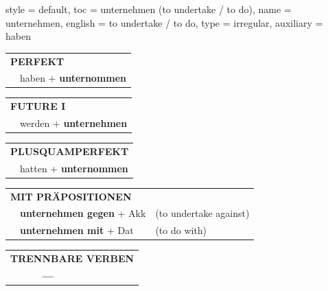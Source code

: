 \begin{verbentry}{
  style = {default},
  toc = {unternehmen (to undertake / to do)},
  name = {unternehmen},
  english = {to undertake / to do},
  type = {irregular},
  auxiliary = {haben}
}
 \begin{tabular}{rl}
     \multicolumn{2}{l}{\textbf{PERFEKT}}\\
   & haben + \textbf{unternommen}\\
  \end{tabular}
\hfill
   \begin{tabular}{rl}
    \multicolumn{2}{l}{\textbf{FUTURE I} }\\
   & werden + \textbf{unternehmen}\\
  \end{tabular}
\hfill
   \begin{tabular}{rl}
      \multicolumn{2}{l}{\textbf{PLUSQUAMPERFEKT}}\\
   & hatten + \textbf{unternommen}\\
  \end{tabular}

   \vspace{10pt}

   \begin{tabular}{lll}
      \multicolumn{3}{l}{\textbf{MIT PRÄPOSITIONEN}}\\
& \textbf{unternehmen gegen} + Akk & (to undertake against)\\
& \textbf{unternehmen mit} + Dat & (to do with)\\
\end{tabular}
  \hfill
   \begin{tabular}{lll}
\multicolumn{3}{l}{\textbf{TRENNBARE VERBEN}}\\
& \textbf{---} & \\
\end{tabular}

  \vspace{-5pt}
\end{verbentry}

